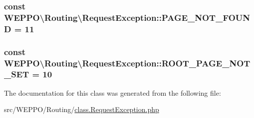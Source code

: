 \subsubsection[{\texorpdfstring{P\+A\+G\+E\+\_\+\+N\+O\+T\+\_\+\+F\+O\+U\+ND}{PAGE_NOT_FOUND}}]{\setlength{\rightskip}{0pt plus 5cm}const W\+E\+P\+P\+O\textbackslash{}\+Routing\textbackslash{}\+Request\+Exception\+::\+P\+A\+G\+E\+\_\+\+N\+O\+T\+\_\+\+F\+O\+U\+ND = 11}\hypertarget{classWEPPO_1_1Routing_1_1RequestException_a3dde2f855d0e343926da5f4e4e06c129}{}\label{classWEPPO_1_1Routing_1_1RequestException_a3dde2f855d0e343926da5f4e4e06c129}
\subsubsection[{\texorpdfstring{R\+O\+O\+T\+\_\+\+P\+A\+G\+E\+\_\+\+N\+O\+T\+\_\+\+S\+ET}{ROOT_PAGE_NOT_SET}}]{\setlength{\rightskip}{0pt plus 5cm}const W\+E\+P\+P\+O\textbackslash{}\+Routing\textbackslash{}\+Request\+Exception\+::\+R\+O\+O\+T\+\_\+\+P\+A\+G\+E\+\_\+\+N\+O\+T\+\_\+\+S\+ET = 10}\hypertarget{classWEPPO_1_1Routing_1_1RequestException_a70772aaeb6bb9abc2ee3ffaf44b262bc}{}\label{classWEPPO_1_1Routing_1_1RequestException_a70772aaeb6bb9abc2ee3ffaf44b262bc}


The documentation for this class was generated from the following file\+:\begin{DoxyCompactItemize}
\item 
src/\+W\+E\+P\+P\+O/\+Routing/\hyperlink{class_8RequestException_8php}{class.\+Request\+Exception.\+php}\end{DoxyCompactItemize}
